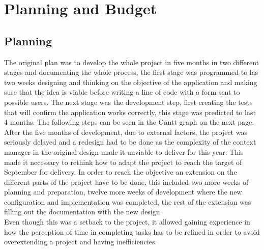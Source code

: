 \chapter{Planning and Budget}\label{chap:8}
\section{Planning}\label{sec:chap5_plan}
The original plan was to develop the whole project in five months in two different stages and documenting the whole process, the first stage was programmed to las two weeks designing and thinking on the objective of the application and making sure that the idea is viable before writing a line of code with a form sent to possible users. The next stage was the development step, first creating the tests that will confirm the application works correctly, this stage was predicted to last 4 months. The following steps can be seen in the Gantt graph on the next page.\\

After the five months of development, due to external factors, the project was seriously delayed and a redesign had to be done as the complexity of the context manager in the original design made it unviable to deliver for this year. This made it necessary to rethink how to adapt the project to reach the target of September for delivery. In order to reach the objective an extension on the different parts of the project have to be done, this included two more weeks of planning and preparation, twelve more weeks of development where the new configuration and implementation was completed, the rest of the extension was filling out the documentation with the new design.\\

Even though this was a setback to the project, it allowed gaining experience in how the perception of time in completing tasks has to be refined in order to avoid overextending a project and having inefficiencies.


